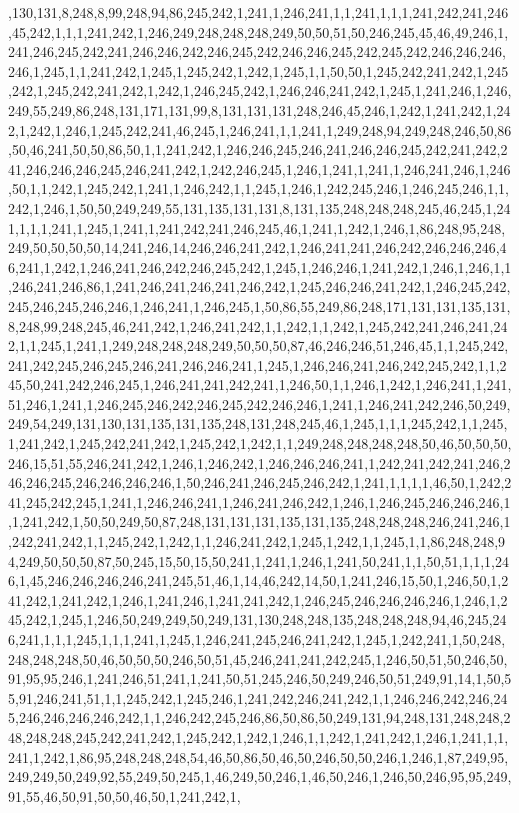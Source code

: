 ,130,131,8,248,8,99,248,94,86,245,242,1,241,1,246,241,1,1,241,1,1,1,241,242,241,246,45,242,1,1,1,241,242,1,246,249,248,248,248,249,50,50,51,50,246,245,45,46,49,246,1,241,246,245,242,241,246,246,242,246,245,242,246,246,245,242,245,242,246,246,246,246,1,245,1,1,241,242,1,245,1,245,242,1,242,1,245,1,1,50,50,1,245,242,241,242,1,245,242,1,245,242,241,242,1,242,1,246,245,242,1,246,246,241,242,1,245,1,241,246,1,246,249,55,249,86,248,131,171,131,99,8,131,131,131,248,246,45,246,1,242,1,241,242,1,242,1,242,1,246,1,245,242,241,46,245,1,246,241,1,1,241,1,249,248,94,249,248,246,50,86,50,46,241,50,50,86,50,1,1,241,242,1,246,246,245,246,241,246,246,245,242,241,242,241,246,246,246,245,246,241,242,1,242,246,245,1,246,1,241,1,241,1,246,241,246,1,246,50,1,1,242,1,245,242,1,241,1,246,242,1,1,245,1,246,1,242,245,246,1,246,245,246,1,1,242,1,246,1,50,50,249,249,55,131,135,131,131,8,131,135,248,248,248,245,46,245,1,241,1,1,1,241,1,245,1,241,1,241,242,241,246,245,46,1,241,1,242,1,246,1,86,248,95,248,249,50,50,50,50,14,241,246,14,246,246,241,242,1,246,241,241,246,242,246,246,246,46,241,1,242,1,246,241,246,242,246,245,242,1,245,1,246,246,1,241,242,1,246,1,246,1,1,246,241,246,86,1,241,246,241,246,241,246,242,1,245,246,246,241,242,1,246,245,242,245,246,245,246,246,1,246,241,1,246,245,1,50,86,55,249,86,248,171,131,131,135,131,8,248,99,248,245,46,241,242,1,246,241,242,1,1,242,1,1,242,1,245,242,241,246,241,242,1,1,245,1,241,1,249,248,248,248,249,50,50,50,87,46,246,246,51,246,45,1,1,245,242,241,242,245,246,245,246,241,246,246,241,1,245,1,246,246,241,246,242,245,242,1,1,245,50,241,242,246,245,1,246,241,241,242,241,1,246,50,1,1,246,1,242,1,246,241,1,241,51,246,1,241,1,246,245,246,242,246,245,242,246,246,1,241,1,246,241,242,246,50,249,249,54,249,131,130,131,135,131,135,248,131,248,245,46,1,245,1,1,1,245,242,1,1,245,1,241,242,1,245,242,241,242,1,245,242,1,242,1,1,249,248,248,248,248,50,46,50,50,50,246,15,51,55,246,241,242,1,246,1,246,242,1,246,246,246,241,1,242,241,242,241,246,246,246,245,246,246,246,246,1,50,246,241,246,245,246,242,1,241,1,1,1,1,46,50,1,242,241,245,242,245,1,241,1,246,246,241,1,246,241,246,242,1,246,1,246,245,246,246,246,1,1,241,242,1,50,50,249,50,87,248,131,131,131,135,131,135,248,248,248,246,241,246,1,242,241,242,1,1,245,242,1,242,1,1,246,241,242,1,245,1,242,1,1,245,1,1,86,248,248,94,249,50,50,50,87,50,245,15,50,15,50,241,1,241,1,246,1,241,50,241,1,1,50,51,1,1,1,246,1,45,246,246,246,246,241,245,51,46,1,14,46,242,14,50,1,241,246,15,50,1,246,50,1,241,242,1,241,242,1,246,1,241,246,1,241,241,242,1,246,245,246,246,246,246,1,246,1,245,242,1,245,1,246,50,249,249,50,249,131,130,248,248,135,248,248,248,94,46,245,246,241,1,1,1,245,1,1,1,241,1,245,1,246,241,245,246,241,242,1,245,1,242,241,1,50,248,248,248,248,50,46,50,50,50,246,50,51,45,246,241,241,242,245,1,246,50,51,50,246,50,91,95,95,246,1,241,246,51,241,1,241,50,51,245,246,50,249,246,50,51,249,91,14,1,50,55,91,246,241,51,1,1,245,242,1,245,246,1,241,242,246,241,242,1,1,246,246,242,246,245,246,246,246,246,242,1,1,246,242,245,246,86,50,86,50,249,131,94,248,131,248,248,248,248,248,245,242,241,242,1,245,242,1,242,1,246,1,1,242,1,241,242,1,246,1,241,1,1,241,1,242,1,86,95,248,248,248,54,46,50,86,50,46,50,246,50,50,246,1,246,1,87,249,95,249,249,50,249,92,55,249,50,245,1,46,249,50,246,1,46,50,246,1,246,50,246,95,95,249,91,55,46,50,91,50,50,46,50,1,241,242,1,